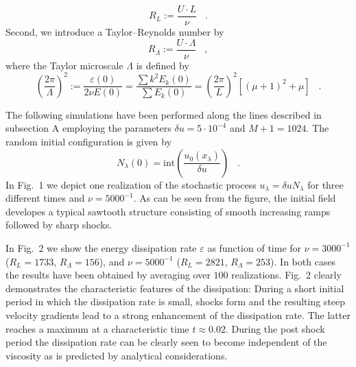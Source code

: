 \begin{equation}
R_L := \frac{U \cdot L}{\nu} \;\;\; .
\end{equation}
Second, we introduce a Taylor--Reynolds number by
\begin{equation}
R_{\Lambda} := \frac{U \cdot \Lambda}{\nu} \;\;\; ,
\end{equation}
where the Taylor microscale $\Lambda$ is defined by
\begin{equation}
\left(\frac{2\pi}{\Lambda}\right)^2 :=
\frac{\varepsilon(0)}{2\nu E(0)} =
\frac{\sum k^2 E_k(0)}{\sum E_k(0)} =
\left( \frac{2\pi}{L} \right)^2 \left[ (\mu +1)^2 + \mu \right]
\;\;\; .
\end{equation}

The following simulations have been performed along the lines
described in subsection A employing the parameters
$\delta u = 5\cdot 10^{-4}$
and $M+1 = 1024$. The random initial configuration is given by
\begin{equation}
\label{INITB}
N_{\lambda}(0) = {\mbox{int}} \left(
\frac{u_0(x_{\lambda})}{\delta u} \right)
\;\;\; .
\end{equation}
In Fig.~1 we depict one realization of the stochastic process
$u_{\lambda} = \delta u N_{\lambda}$ for three different times and
$\nu = 5000^{-1}$. As can be seen from the figure,
the initial field developes a typical sawtooth structure
consisting of
smooth increasing ramps followed by sharp shocks.

In Fig.~2 we show
the energy dissipation rate $\varepsilon$ as function of time for 
$\nu = 3000^{-1}$ ($R_{L}= 1733$, $R_{\Lambda}= 156$),
and $\nu = 5000^{-1}$ ($R_{L}= 2821$, $R_{\Lambda}= 253$).
In both cases the results have been obtained by averaging
over $100$ realizations. Fig.~2 clearly demonstrates the
characteristic
features of the dissipation: During a short initial period in which
the dissipation rate is small, shocks form and the resulting
steep velocity gradients lead to a strong enhancement of the
dissipation
rate. The latter reaches a maximum at a characteristic time
$t \approx 0.02$.
During the post
shock period the dissipation rate can be clearly seen to
become independent
of the viscosity as is predicted by analytical
considerations\cite{KRAICHNAN,SAFFMAN}.

